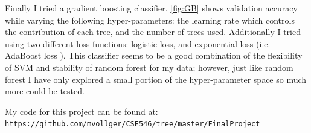 \documentclass{article}
\begin{document}
Finally I tried a gradient boosting classifier.  \autoref{fig:GB} shows validation accuracy while varying the following hyper-parameters: the learning rate which controls the contribution of each tree, and the number of trees used. Additionally I tried using two different loss functions: logistic loss, and exponential loss (i.e. AdaBoost loss \parencite{Freund1997ABoosting}). This classifier seems to be a good combination of the flexibility of SVM and stability of random forest for my data; however, just like random forest I have only explored a small portion of the hyper-parameter space so much more could be tested. 

My code for this project can be found at: \\
\texttt{https://github.com/mvollger/CSE546/tree/master/FinalProject}
\end{document}
